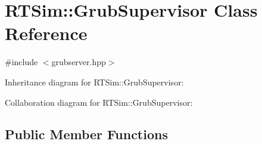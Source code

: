 \hypertarget{classRTSim_1_1GrubSupervisor}{}\section{R\+T\+Sim\+:\+:Grub\+Supervisor Class Reference}
\label{classRTSim_1_1GrubSupervisor}


{\ttfamily \#include $<$grubserver.\+hpp$>$}



Inheritance diagram for R\+T\+Sim\+:\+:Grub\+Supervisor\+:


Collaboration diagram for R\+T\+Sim\+:\+:Grub\+Supervisor\+:
\subsection*{Public Member Functions}
